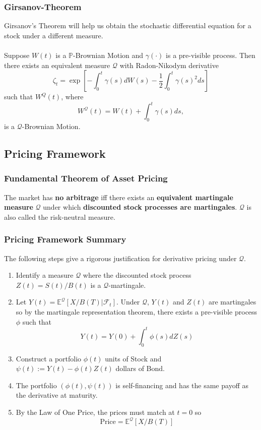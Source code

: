 \documentclass[11pt]{article}
\newcommand{\E}{\mathbb{E}}
\newcommand{\PR}{\mathbb{P}}
\newcommand{\Q}{\mathcal{Q}}
\begin{document}
	\subsubsection{Girsanov-Theorem}
	Girsanov's Theorem will help us obtain the stochastic differential equation for a stock under a different measure.\\\\
	Suppose \( W(t) \) is a \( \PR \)-Brownian Motion and \( \gamma(\cdot) \) is a pre-visible process. Then there exists an equivalent measure \( \Q \) with Radon-Nikodym derivative 
	\[	\zeta_t = \exp\left[-\int_{0}^{t}\gamma(s)dW(s) - \frac{1}{2}\int_{0}^{t}\gamma(s)^2 ds\right]
		\]
	such that \( W^{Q}(t) \), where
	\[	W^{\Q}(t) = W(t) + \int_{0}^{t} \gamma(s)ds,\]
	is a \( \Q \)-Brownian Motion.
	\subsection{Pricing Framework}
	\subsubsection{Fundamental Theorem of Asset Pricing}
	The market has \textbf{no arbitrage} iff there exists an \textbf{equivalent martingale measure} \( \Q \) under which \textbf{discounted stock processes are martingales}. \( \Q \) is also called the risk-neutral measure.
	\subsubsection{Pricing Framework Summary}
	The following steps give a rigorous justification for derivative pricing under \( \Q \).
	\begin{enumerate}
		\item Identify a measure \( \Q \) where the discounted stock process \( Z(t) = S(t)/B(t) \) is a \( \Q \)-martingale.
		\item Let \( Y(t) = \E^{\Q}\left[X/B(T)|\mathcal{F}_t\right] \). Under \( \Q \), \( Y(t) \) and \( Z(t) \) are martingales so by the martingale representation theorem, there exists a pre-visible process \( \phi \) such that
		\[	Y(t) = Y(0) + \int_{0}^{t}\phi(s)dZ(s) 
		   \]
		\item Construct a portfolio \( \phi(t) \) units of Stock and \( \psi(t) := Y(t) - \phi(t)Z(t) \) dollars of Bond.
		\item The portfolio \( (\phi(t), \psi(t)) \) is self-financing and has the same payoff as the derivative at maturity.
		\item By the Law of One Price, the prices must match at \( t = 0 \) so
		\[	\text{Price} = \E^{\Q}[X/B(T)]
			\]
	\end{enumerate}
\end{document}
